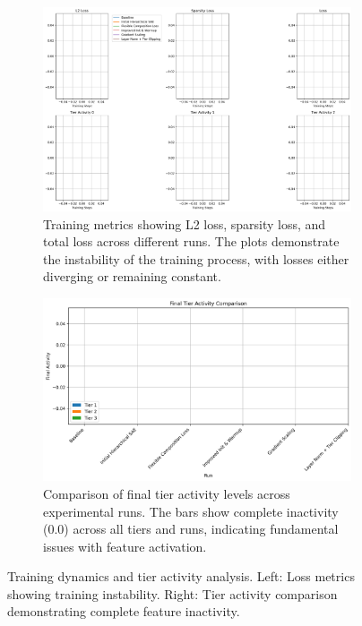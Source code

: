 \documentclass{article} %
\begin{document}
\begin{figure}[h]
    \centering
    \begin{subfigure}{0.49\textwidth}
        \includegraphics[width=\textwidth]{training_metrics.png}
        \caption{Training metrics showing L2 loss, sparsity loss, and total loss across different runs. The plots demonstrate the instability of the training process, with losses either diverging or remaining constant.}
        \label{fig:training_metrics}
    \end{subfigure}
    \hfill
    \begin{subfigure}{0.49\textwidth}
        \includegraphics[width=\textwidth]{tier_activity_comparison.png}
        \caption{Comparison of final tier activity levels across experimental runs. The bars show complete inactivity (0.0) across all tiers and runs, indicating fundamental issues with feature activation.}
        \label{fig:tier_activity}
    \end{subfigure}
    \caption{Training dynamics and tier activity analysis. Left: Loss metrics showing training instability. Right: Tier activity comparison demonstrating complete feature inactivity.}
    \label{fig:training_dynamics}
\end{figure}
\end{document}
